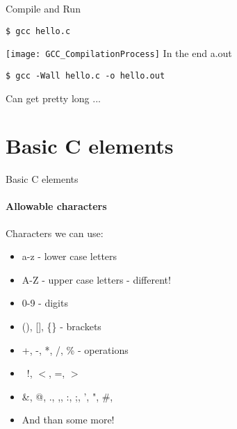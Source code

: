 \documentclass[10pt]{beamer}
\begin{document}
\begin{frame}[fragile]{Compile and Run}
\begin{lstlisting}[style=consol, numbers=none]
$ gcc hello.c
\end{lstlisting}
\centering
\texttt{[image: GCC\_CompilationProcess]}
\newline In the end a.out
\vspace{0.2cm}

\begin{lstlisting}[style=consol, numbers=none]
$ gcc -Wall hello.c -o hello.out
\end{lstlisting}
Can get pretty long ...
\end{frame}

\section{Basic C elements}

\begin{frame}{Basic C elements}
  \framesubtitle{Allowable characters}
  \centering
  Characters we can use:
  \begin{itemize}
    \item a-z - lower case letters
    \item A-Z - upper case letters - different!
    \item 0-9 - digits
    \item (), [], \{\} - brackets
    \item +, -, *, /, \% - operations
    \item \, !, $<$, =, $>$
    \item \&, @, ., ,, :, ;, ', ", \#,
    \item And than some more!
  \end{itemize}
\end{frame}
\end{document}
